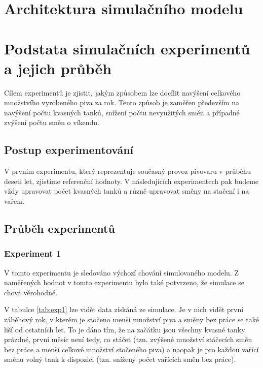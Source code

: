 \documentclass[11pt,a4paper]{article}
\begin{document}
\section{Architektura simulačního modelu}


\section{Podstata simulačních experimentů a jejich průběh}
Cílem experimentů je zjistit, jakým způsobem lze docílit navýšení celkového množstvího vyrobeného piva za rok. Tento způsob je zaměřen především na navýšení počtu kvasných tanků, snížení počtu nevyužitých směn a případné zvýšení počtu směn o víkendu.

\subsection{Postup experimentování}
V prvním experimentu, který reprezentuje současný provoz pivovaru v průběhu deseti let, zjistíme referenční hodnoty. V následujících experimentech pak budeme vždy upravovat počet kvasných tanků a různě upravovat směny na stačení i na vaření.

\subsection{Průběh experimentů}
\subsubsection{Experiment 1}
V tomto experimentu je sledováno výchozí chování simulovaného modelu. Z naměřených hodnot v tomto experimentu bylo také potvrzeno, že simulace se chová věrohodně.

V tabulce \ref{tab:exp1} lze vidět data získáná ze simulace. Je v nich vidět první záběhový rok, v kterém je stočeno menší množství piva a směny bez práce se také liší od ostatních let. To je dáno tím, že na začátku jsou všechny kvasné tanky prázdné, první měsíc není tedy, co stáčet (tzn. zvýšené množství stáčecích směn bez práce a menší celkové množství stočeného piva) a naopak je pro každou vařící směnu volný tank k dispozici (tzn. snížený počet vařících směn bez práce).
\end{document}
